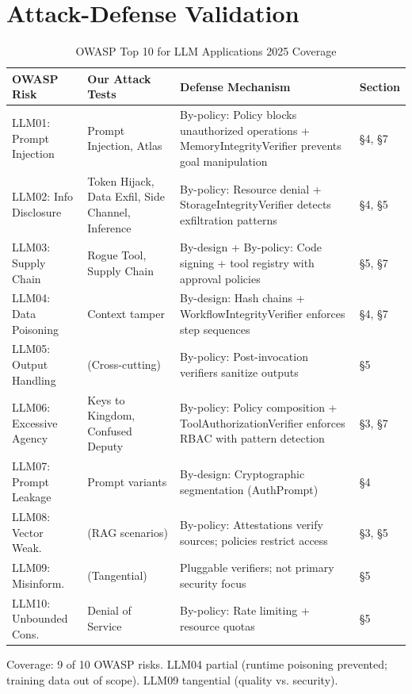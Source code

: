 \section{Attack-Defense Validation}
\label{sec:attack-defense}

\begin{table}[t]
\centering
\caption{OWASP Top 10 for LLM Applications 2025 Coverage}
\label{tab:owasp-coverage}
\scriptsize
\begin{tabular}{|p{3cm}|p{4cm}|p{6.5cm}|p{1.5cm}|}
\hline
\textbf{OWASP Risk} & \textbf{Our Attack Tests} & \textbf{Defense Mechanism} & \textbf{Section} \\
\hline
LLM01: Prompt Injection & Prompt Injection, Atlas & By-policy: Policy blocks unauthorized operations + MemoryIntegrityVerifier prevents goal manipulation & §4, §7 \\
\hline
LLM02: Info Disclosure & Token Hijack, Data Exfil, Side Channel, Inference & By-policy: Resource denial + StorageIntegrityVerifier detects exfiltration patterns & §4, §5 \\
\hline
LLM03: Supply Chain & Rogue Tool, Supply Chain & By-design + By-policy: Code signing + tool registry with approval policies & §5, §7 \\
\hline
LLM04: Data Poisoning & Context tamper & By-design: Hash chains + WorkflowIntegrityVerifier enforces step sequences & §4, §7 \\
\hline
LLM05: Output Handling & (Cross-cutting) & By-policy: Post-invocation verifiers sanitize outputs & §5 \\
\hline
LLM06: Excessive Agency & Keys to Kingdom, Confused Deputy & By-policy: Policy composition + ToolAuthorizationVerifier enforces RBAC with pattern detection & §3, §7 \\
\hline
LLM07: Prompt Leakage & Prompt variants & By-design: Cryptographic segmentation (AuthPrompt) & §4 \\
\hline
LLM08: Vector Weak. & (RAG scenarios) & By-policy: Attestations verify sources; policies restrict access & §3, §5 \\
\hline
LLM09: Misinform. & (Tangential) & Pluggable verifiers; not primary security focus & §5 \\
\hline
LLM10: Unbounded Cons. & Denial of Service & By-policy: Rate limiting + resource quotas & §5 \\
\hline
\end{tabular}

\raggedright
\scriptsize{Coverage: 9 of 10 OWASP risks. LLM04 partial (runtime poisoning prevented; training data out of scope). LLM09 tangential (quality vs. security).}
\end{table}

